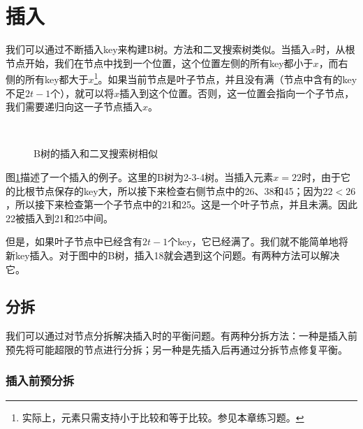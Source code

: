 \documentclass{ctexart}
\begin{document}
\section{插入}
\label{btree-insertion}

我们可以通过不断插入key来构建B树。方法和二叉搜索树类似。当插入$x$时，从根节点开始，我们在节点中找到一个位置，这个位置左侧的所有key都小于$x$，而右侧的所有key都大于$x$\footnote{实际上，元素只需支持小于比较和等于比较。参见本章练习题。}。如果当前节点是叶子节点，并且没有满（节点中含有的key不足$2t-1$个），就可以将$x$插入到这个位置。否则，这一位置会指向一个子节点，我们需要递归向这一子节点插入$x$。

\begin{figure}[htbp]
  \centering
   \\
  \caption{B树的插入和二叉搜索树相似} \label{fig:btree-insert-simple}
\end{figure}

图\ref{fig:btree-insert-simple}描述了一个插入的例子。这里的B树为2-3-4树。当插入元素$x=22$时，由于它的比根节点保存的key大，所以接下来检查右侧节点中的26、38和45；因为$22 < 26$，所以接下来检查第一个子节点中的21和25。这是一个叶子节点，并且未满。因此22被插入到21和25中间。

但是，如果叶子节点中已经含有$2t-1$个key，它已经满了。我们就不能简单地将新key插入。对于图中的B树，插入18就会遇到这个问题。有两种方法可以解决它。

\subsection{分拆}
\label{split}

我们可以通过对节点分拆解决插入时的平衡问题。有两种分拆方法：一种是插入前预先将可能超限的节点进行分拆；另一种是先插入后再通过分拆节点修复平衡。

\subsubsection{插入前预分拆}
\end{document}

